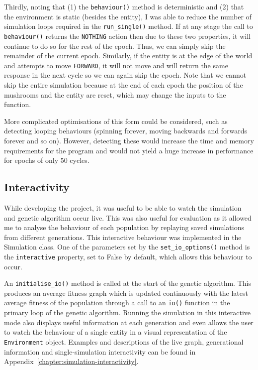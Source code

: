\documentclass[12pt,a4paper]{report}
\begin{document}
Thirdly, noting that (1) the \texttt{behaviour()} method is deterministic and (2) that the environment is static (besides the entity), I was able to reduce the number of simulation loops required in the \texttt{run\_single()} method. If at any stage the call to \texttt{behaviour()} returns the \texttt{NOTHING} action then due to these two properties, it will continue to do so for the rest of the epoch. Thus, we can simply skip the remainder of the current epoch. Similarly, if the entity is at the edge of the world and attempts to move \texttt{FORWARD}, it will not move and will return the same response in the next cycle so we can again skip the epoch. Note that we cannot skip the entire simulation because at the end of each epoch the position of the mushrooms and the entity are reset, which may change the inputs to the function.

More complicated optimisations of this form could be considered, such as detecting looping behaviours (spinning forever, moving backwards and forwards forever and so on). However, detecting these would increase the time and memory requirements for the program and would  not yield a huge increase in performance for epochs of only 50 cycles.

\subsection{Interactivity}\label{section:interactivity}

While developing the project, it was useful to be able to watch the simulation and genetic algorithm occur live. This was also useful for evaluation as it allowed me to analyse the behaviour of each population by replaying saved simulations from different generations. This interactive behaviour was implemented in the Simulation class. One of the parameters set by the \texttt{set\_io\_options()} method is the \texttt{interactive} property, set to False by default, which allows this behaviour to occur.

An \texttt{initialise\_io()} method is called at the start of the genetic algorithm. This produces an average fitness graph which is updated continuously with the latest average fitness of the population through a call to an \texttt{io()} function in the primary loop of the genetic algorithm. Running the simulation in this interactive mode also displays useful information at each generation and even allows the user to watch the behaviour of a single entity in a visual representation of the \texttt{Environment} object. Examples and descriptions of the live graph, generational information and single-simulation interactivity can be found in Appendix~\ref{chapter:simulation-interactivity}.
\end{document}

